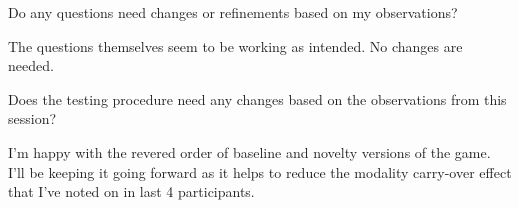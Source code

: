 \begin{QandA}
    \item Do any questions need changes or refinements based on my observations?
    \begin{answered}
        The questions themselves seem to be working as intended. No changes are needed.
    \end{answered}

    \item Does the testing procedure need any changes based on the observations from this session?
    \begin{answered}
        I'm happy with the revered order of baseline and novelty versions of the game. I'll be keeping it going forward as it helps to reduce the modality carry-over effect that I've noted on in last 4 participants.
    \end{answered}
\end{QandA}